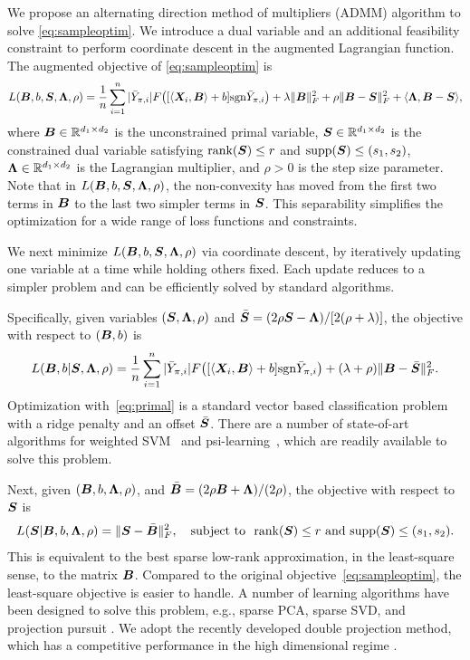 \documentclass[aos]{imsart}
\theoremstyle{definition}
\def\sign{\textup{sgn}}
\def\rank{\textup{rank}}
\begin{document}
We propose an alternating direction method of multipliers (ADMM) algorithm to solve \eqref{eq:sampleoptim}. We introduce a dual variable and an additional feasibility constraint to perform coordinate descent in the augmented Lagrangian function. The augmented objective of \eqref{eq:sampleoptim} is
\begin{equation*} \label{eq:ADMM}
L(\mB,b, \mS,\mLambda,\rho) = {1\over n}\sum_{i=1}^n|\bar Y_{\pi, i}|F\big([\langle \mX_i,\mB \rangle+b]\sign \bar Y_{\pi, i}\big)  + \lambda\FnormSize{}{\mB}^2+\rho\FnormSize{}{\mB-\mS}^2+\langle \mLambda, \mB-\mS\rangle,
\end{equation*}
where $\bm B\in \mathbb{R}^{d_1\times d_2}$ is the unconstrained primal variable, $\bm S\in\mathbb{R}^{d_1\times d_2}$ is the constrained dual variable satisfying $\rank(\mS)\leq r$ and $\text{supp}(\bm S)\leq (s_1,s_2)$, $\bm{\Lambda}\in\mathbb{R}^{d_1\times d_2}$ is the Lagrangian multiplier, and $\rho>0$ is the step size parameter. Note that in $L(\bm B,b, \bm S,\bm{\Lambda},\rho)$, the non-convexity has moved from the first two terms in $\bm B$ to the last two simpler terms in $\bm S$. This separability simplifies the optimization for a wide range of loss functions and constraints. 

We next minimize $L(\bm B,b, \bm S,\bm{\Lambda},\rho)$ via coordinate descent, by iteratively updating one variable at a time while holding others fixed. Each update reduces to a simpler problem and can be efficiently solved by standard algorithms. 

Specifically, given variables $(\bm S,\bm{\Lambda},\rho)$ and $\bar {\bm S} = (2\rho\bm S-\bm{\Lambda}) / [2(\rho+\lambda)]$, the objective with respect to $(\bm B,b)$ is 
\begin{equation*} \label{eq:primal}
L(\mB,b|\mS,\mLambda,\rho)={1\over n}\sum_{i=1}^n |\bar Y_{\pi, i}| F\big ([\langle \mX_i,\mB \rangle+b]\sign \bar Y_{\pi, i}\big) +(\lambda+\rho)\FnormSize{}{\mB-\bar \mS}^2.
\end{equation*}
Optimization with~\eqref{eq:primal} is a standard vector based classification problem with a ridge penalty and an offset $\bar {\bm S}$. There are a number of state-of-art algorithms for weighted SVM~\cite{wang2008probability} and psi-learning~\cite{shen2003psi}, which are readily available to solve this problem.  

Next, given $(\bm B,b,\bm{\Lambda},\rho)$, and $\bar {\bm B}=(2\rho\bm B+\bm{\Lambda}) / (2\rho)$, the objective with respect to $\bm S$ is
\begin{equation}\label{eq:dual}
L(\mS|\mB,b,\mLambda,\rho)=\FnormSize{}{\mS-\bar \mB}^2,\quad \text{subject to} ~~ \rank(\mS)\leq r \text{ and }\text{supp}(\mS)\leq (s_1,s_2).
\end{equation}
This is equivalent to the best sparse low-rank approximation, in the least-square sense, to the matrix $\bm B$. Compared to the original objective~\eqref{eq:sampleoptim}, the least-square objective is easier to handle. A number of learning algorithms have been designed to solve this problem, e.g., sparse PCA, sparse SVD, and projection pursuit \citep{Ma2013}. We adopt the recently developed double projection method, which has a competitive performance in the high dimensional regime \cite{Ma2016}. 
\end{document}
